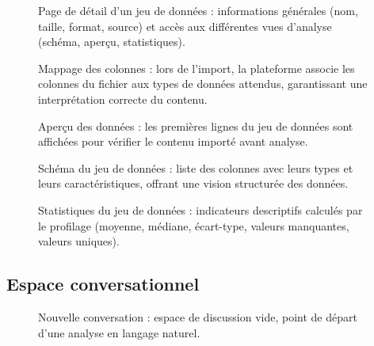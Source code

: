 \begin{figure}[H]
\centering
{}
\caption{Page de détail d'un jeu de données : informations générales (nom, taille, format, source) et accès aux différentes vues d'analyse (schéma, aperçu, statistiques).}
\label{fig:annexe-dataset-detail}
\end{figure}

\begin{figure}[H]
\centering
{}
\caption{Mappage des colonnes : lors de l'import, la plateforme associe les colonnes du fichier aux types de données attendus, garantissant une interprétation correcte du contenu.}
\label{fig:annexe-column-mapping}
\end{figure}

\begin{figure}[H]
\centering
{}
\caption{Aperçu des données : les premières lignes du jeu de données sont affichées pour vérifier le contenu importé avant analyse.}
\label{fig:annexe-dataset-preview}
\end{figure}

\begin{figure}[H]
\centering
{}
\caption{Schéma du jeu de données : liste des colonnes avec leurs types et leurs caractéristiques, offrant une vision structurée des données.}
\label{fig:annexe-dataset-schema}
\end{figure}

\begin{figure}[H]
\centering
{}
\caption{Statistiques du jeu de données : indicateurs descriptifs calculés par le profilage (moyenne, médiane, écart-type, valeurs manquantes, valeurs uniques).}
\label{fig:annexe-dataset-stats}
\end{figure}

\subsection{Espace conversationnel}

\begin{figure}[H]
\centering
{}
\caption{Nouvelle conversation : espace de discussion vide, point de départ d'une analyse en langage naturel.}
\label{fig:annexe-new-conversation}
\end{figure}

